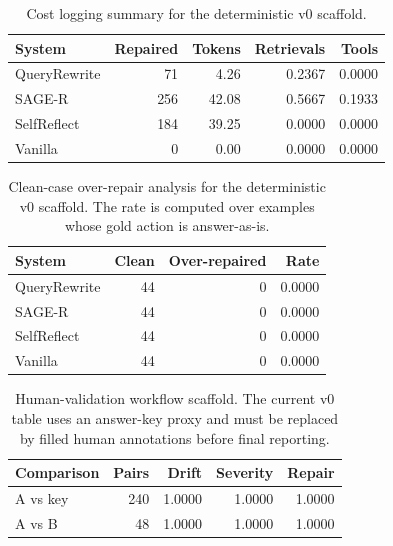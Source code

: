 \documentclass[letterpaper]{article}
\begin{document}
\begin{table}[t]
\centering
\scriptsize
\setlength{\tabcolsep}{3pt}
\begin{tabular}{lrrrr}
\toprule
System & Repaired & Tokens & Retrievals & Tools \\
\midrule
QueryRewrite & 71 & 4.26 & 0.2367 & 0.0000 \\
SAGE-R & 256 & 42.08 & 0.5667 & 0.1933 \\
SelfReflect & 184 & 39.25 & 0.0000 & 0.0000 \\
Vanilla & 0 & 0.00 & 0.0000 & 0.0000 \\
\bottomrule
\end{tabular}
\caption{Cost logging summary for the deterministic v0 scaffold.}
\label{tab:v0-cost}
\end{table}
\begin{table}[t]
\centering
\scriptsize
\setlength{\tabcolsep}{3pt}
\begin{tabular}{lrrr}
\toprule
System & Clean & Over-repaired & Rate \\
\midrule
QueryRewrite & 44 & 0 & 0.0000 \\
SAGE-R & 44 & 0 & 0.0000 \\
SelfReflect & 44 & 0 & 0.0000 \\
Vanilla & 44 & 0 & 0.0000 \\
\bottomrule
\end{tabular}
\caption{Clean-case over-repair analysis for the deterministic v0 scaffold. The rate is computed over examples whose gold action is answer-as-is.}
\label{tab:v0-over-repair}
\end{table}
\begin{table}[t]
\centering
\scriptsize
\setlength{\tabcolsep}{3pt}
\begin{tabular}{lrrrr}
\toprule
Comparison & Pairs & Drift & Severity & Repair \\
\midrule
A vs key & 240 & 1.0000 & 1.0000 & 1.0000 \\
A vs B & 48 & 1.0000 & 1.0000 & 1.0000 \\
\bottomrule
\end{tabular}
\caption{Human-validation workflow scaffold. The current v0 table uses an answer-key proxy and must be replaced by filled human annotations before final reporting.}
\label{tab:v0-human}
\end{table}
\end{document}

